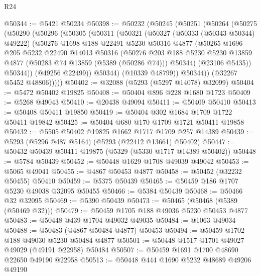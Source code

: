 \begin{lexlean}{R24}
\begin{coremodule}
@50344 := @5421 @50234
@50398 := @50232
    (@50245
      (@50251
        (@50264
          (@50275
            (@50290
              (@50296
                (@50305
                  (@50311
                    (@50321
                      (@50327
                        (@50333 (@50343 @50344) @49222)
                        (@50276
                          @1698
                          @188
                          @22491
                          @5230
                          @50316
                          @4877
                          (@50265
                            @1696
                            @205
                            @5232
                            @22490
                            @14013
                            @50316
                            (@50276
                              @203
                              @188
                              @5230
                              @5230
                              @13859
                              @4877
                              (@50283 @74 @13859 (@5389 (@50286 @74)))
                              @50344)
                            (@23106 @5435))
                          @50344))
                      (@49256 @22499))
                    @50344)
                  (@10339 @48799))
                @50344))
            (@32267 @5452 @48806)))))
@50402 := @32088 (@5293 (@5297 @14078) @32099)
@50404 := @5472 @50402 @19825
@50408 := @50404 @896 @228 @1680 @1723
@50409 := @5268 @49043
@50410 := @20438 @49094
@50411 := @50409 @50410
@50413 := @50408 @50411 @19850
@50419 := @50404 @302 @1684 @1709 @1722 @50411 @19842
@50425 := @50404 @680 @170 @1709 @1721 @50411 @19858
@50432 := @5505 @50402 @19825 @1662 @1717 @1709 @257 @14389
@50439 := @5293 (@5296 @487 @5164) (@5293 (@22412 @13661) @50402)
@50447 := @50432 @50439 @50411 @19875 (@5329 (@5330 @1717 @14389 @50402))
@50448 := @5784 @50439
@50452 := @50448 @1629 @1708 @49039 @49042
@50453 := @5065 @49041
@50455 := @4867 @50453 @4877
@50458 := @50452 (@32232 @50455) @50410
@50459 := @5375 @50439
@50465 := @50459 @186 @1707 @5230 @49038 @32095 @50455
@50466 := @5384 @50439
@50468 := @50466 @32 @32095
@50469 := @5390 @50439
@50473 := @50465 (@50468 (@5389 (@50469 @32)))
@50479 := @50459 @1705 @188 @49036 @5230 @50453 @4877
@50483 := @50448 @439 @1704 @49032 @49035
@50484 := @1063 @49034
@50488 := @50483 (@4867 @50484 @4877) @50453
@50494 := @50459 @1702 @188 @49030 @5230 @50484 @4877
@50501 := @50448 @1517 @1701 @49027 @49029 (@49191 @22958) @50484
@50507 := @50459 @1691 @1700 @48690 @22650 @49190 @22958
@50513 := @50448 @444 @1690 @5232 @48689 @49206 @49190

\end{coremodule}
\end{lexlean}
